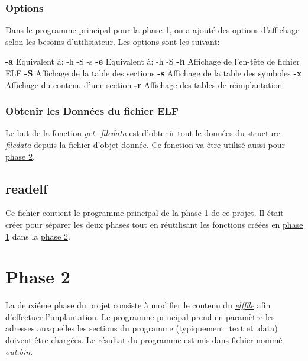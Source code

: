 \documentclass[a4paper]{article} %
\begin{document}
\subsubsection*{Options}
\label{sec:options}
Dans le programme principal pour la phase 1, on a ajouté des options d'affichage 
selon les besoins d'utilisiateur. Les options sont les suivant:

\tabto{3em} \textbf{-a} \tabto{10em} Equivalent à: -h -S -s
\tabto{3em} \textbf{-e} \tabto{10em} Equivalent à: -h -S
\tabto{3em} \textbf{-h} \tabto{10em} Affichage de l'en-tête de fichier ELF
\tabto{3em} \textbf{-S} \tabto{10em} Affichage de la table des sections
\tabto{3em} \textbf{-s} \tabto{10em} Affichage de la table des symboles
\tabto{3em} \textbf{-x} \tabto{10em} Affichage du contenu d'une section
\tabto{3em} \textbf{-r} \tabto{10em} Affichage des tables de réimplantation

\subsubsection*{Obtenir les Données du fichier ELF}
\label{sec:data}
Le but de la fonction \textit{get\_filedata} est d'obtenir tout le données du 
structure \hyperref[sec:filedata]{\textit{filedata}} depuis la fichier d'objet donnée. Ce fonction va être 
utilisé aussi pour \hyperref[sec:phase2]{phase 2}. 


\subsection{readelf}
\label{sec:readelf}
Ce fichier contient le programme principal de la \hyperref[sec:phase1]{phase 1} de ce projet. 
Il était créer pour séparer les deux phases tout en réutilisant les fonctions créées en 
\hyperref[sec:phase1]{phase 1} dans la \hyperref[sec:phase2]{phase 2}.


\section{Phase 2}
\label{sec:phase2}
La deuxiéme phase du projet consiste à modifier le contenu du \hyperref[sec:elffile]{\textit{elffile}}
afin d'effectuer l'implantation. Le programme principal prend en paramètre 
les adresses auxquelles les sections du programme (typiquement .text et .data) 
doivent être chargées. Le résultat du programme est mis dans fichier nommé 
\hyperref[sec:bin]{\textit{out.bin}}. 
\end{document}
